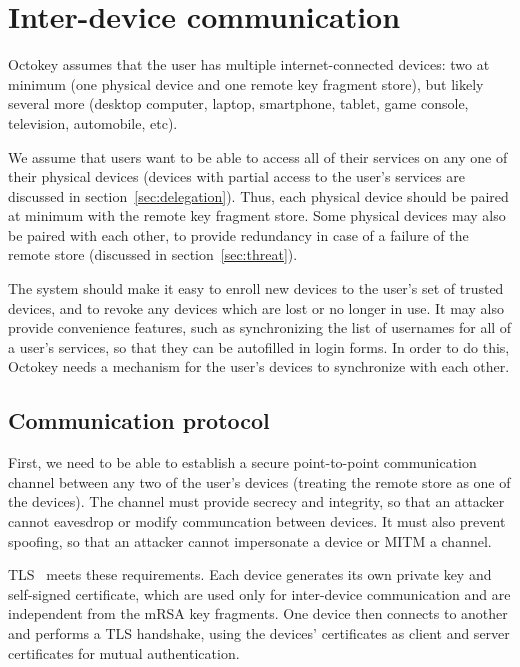 \section{Inter-device communication}\label{sec:interdevice}

Octokey assumes that the user has multiple internet-connected devices: two at minimum (one physical
device and one remote key fragment store), but likely several more (desktop computer, laptop,
smartphone, tablet, game console, television, automobile, etc).

We assume that users want to be able to access all of their services on any one of their physical
devices (devices with partial access to the user's services are discussed in
section~\ref{sec:delegation}). Thus, each physical device should be paired at minimum with the
remote key fragment store. Some physical devices may also be paired with each other, to provide
redundancy in case of a failure of the remote store (discussed in section~\ref{sec:threat}).

The system should make it easy to enroll new devices to the user's set of trusted devices, and to
revoke any devices which are lost or no longer in use. It may also provide convenience features,
such as synchronizing the list of usernames for all of a user's services, so that they can be
autofilled in login forms. In order to do this, Octokey needs a mechanism for the user's devices to
synchronize with each other.

\subsection{Communication protocol}\label{sec:channels}

First, we need to be able to establish a secure point-to-point communication channel between any two
of the user's devices (treating the remote store as one of the devices). The channel must provide
secrecy and integrity, so that an attacker cannot eavesdrop or modify communcation between devices.
It must also prevent spoofing, so that an attacker cannot impersonate a device or MITM a channel.

TLS~\cite{TLS} meets these requirements. Each device generates its own private key and self-signed
certificate, which are used only for inter-device communication and are independent from the mRSA
key fragments. One device then connects to another and performs a TLS handshake, using the devices'
certificates as client and server certificates for mutual authentication.

